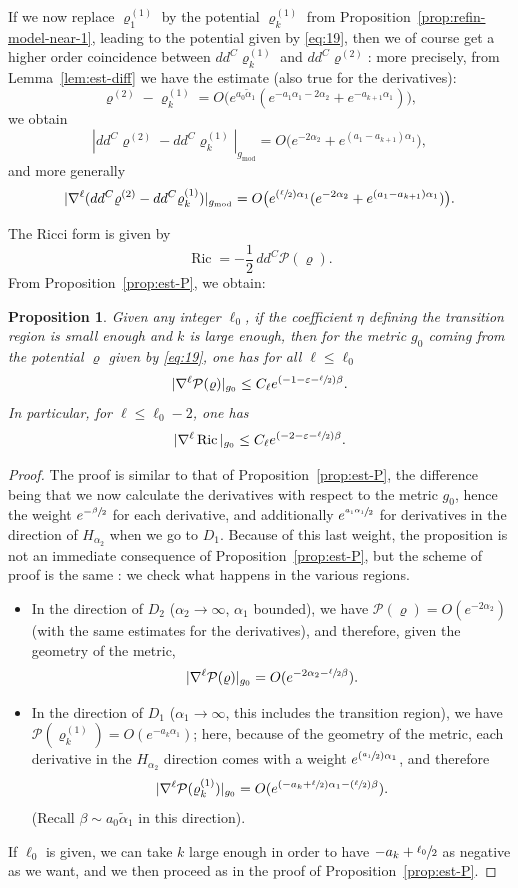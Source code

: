 \documentclass[JEP,XML,SOM,Unicode, NoEqCountersInSection, NoFloatCountersInSection]{cedram}
\newcommand{\Psfrac}[2]{(\sfrac{#1}{#2})}
\theoremstyle{plain}
\newtheorem{prop}[thm]{Proposition}
\theoremstyle{definition}
\DeclareMathOperator{\mo}{mod}
\DeclareMathOperator{\Ric}{Ric}
\newcommand{\ta}{\tilde \alpha}
\newcommand{\opP}{\mathcal{P}}
\newcommand{\rhodeux}{\varrho^{(2)}}
\newcommand{\rhoun}{\varrho^{(1)}}
\begin{document}
If we now replace $\rhoun_1$ by the potential $\rhoun_k$ from Proposition~\ref{prop:refin-model-near-1}, leading to the potential given by \eqref{eq:19}, then we of course get a higher order coincidence between $dd^C\rhoun_k$ and $dd^C\rhodeux$: more precisely, from Lemma~\ref{lem:est-diff} we have the estimate (also true for the derivatives):
\[ \rhodeux - \rhoun_k = O\big(e^{a_0\ta_1} (e^{-a_1\alpha_1-2\alpha_2}+e^{-a_{k+1}\alpha_1}) \big), \]
we obtain
\[ |dd^C\rhodeux - dd^C\rhoun_k|_{g_{\mo}} = O\big( e^{-2\alpha_2} + e^{(a_1-a_{k+1})\alpha_1} \big), \]
and more generally
\[ |\nabla^\ell(dd^C\rhodeux - dd^C\rhoun_k)|_{g_{\mo}} = O\big( e^{\Psfrac\ell2 \alpha_1}(e^{-2\alpha_2} + e^{(a_1-a_{k+1})\alpha_1}) \big). \]

The Ricci form is given by
\[ \Ric = - \frac12\, dd^C \opP(\varrho). \]
From Proposition~\ref{prop:est-P}, we obtain:
\begin{prop}\label{prop:est-Ric}
Given any integer $\ell_0$, if the coefficient $\eta$ defining the transition region is small enough and $k$ is large enough, then for the metric $g_0$ coming from the potential $\varrho$ given by \eqref{eq:19}, one has for all $\ell\leq\ell_0$
\[ |\nabla^\ell \opP(\varrho)|_{g_0} \leq C_\ell e^{(-1-\varepsilon-\sfrac\ell2)\beta}. \]
In particular, for $\ell\leq \ell_0-2$, one has
\[ |\nabla^\ell\Ric|_{g_0} \leq C_\ell e^{(-2-\varepsilon-\sfrac\ell2)\beta}. \]
\end{prop}
\begin{proof}
The proof is similar to that of Proposition~\ref{prop:est-P}, the difference being that we now calculate the derivatives with respect to the metric $g_0$, hence the weight $e^{-\sfrac \beta2}$ for each derivative, and additionally $e^{\sfrac{a_1\alpha_1}2}$ for derivatives in the direction of $H_{\alpha_2}$ when we go to $D_1$. Because of this last weight, the proposition is not an immediate consequence of Proposition~\ref{prop:est-P}, but the scheme of proof is the same : we check what happens in the various regions.
\begin{itemize}
\item In the direction of $D_2$ ($\alpha_2\to\infty$, $\alpha_1$ bounded), we have $\opP(\varrho)=O(e^{-2\alpha_2})$ (with the same estimates for the derivatives), and therefore, given the geometry of the metric,
\[ |\nabla^\ell \opP(\varrho)|_{g_0} = O(e^{-2\alpha_2-\sfrac \ell2 \beta}) . \]
\item In the direction of $D_1$ ($\alpha_1\to\infty$, this includes the transition region), we have $\opP(\rhoun_k)=O(e^{-a_k\alpha_1})$; here, because of the geometry of the metric, each derivative in the $H_{\alpha_2}$ direction comes with a weight $e^{\Psfrac{a_1}2\alpha_1}$, and therefore
\[ |\nabla^\ell \opP(\rhoun_k)|_{g_0} = O(e^{(-a_k+\sfrac\ell2)\alpha_1-\Psfrac \ell2 \beta}). \]
(Recall $\beta\sim a_0\ta_1$ in this direction).
\end{itemize}
If $\ell_0$ is given, we can take $k$ large enough in order to have $-a_k+\sfrac{\ell_0}2$ as negative as we want, and we then proceed as in the proof of Proposition~\ref{prop:est-P}.
\end{proof}
\end{document}
